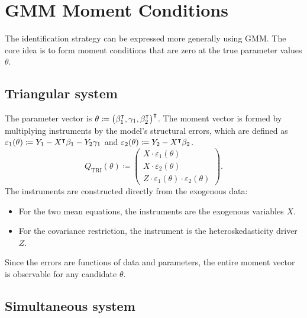 \section{GMM Moment Conditions}

The identification strategy can be expressed more generally using
GMM. The core idea is to form moment conditions that are zero at the
true parameter values $\theta$.

\subsection{Triangular system}

The parameter vector is $\theta\coloneqq\bigl(\beta_{1}^{\intercal},\gamma_{1},\beta_{2}^{\intercal}\bigr)^{\intercal}$.
The moment vector is formed by multiplying instruments by the model's
structural errors, which are defined as $\varepsilon_{1}(\theta)\coloneqq Y_{1}-X^{\intercal}\beta_{1}-Y_{2}\gamma_{1}$
and $\varepsilon_{2}(\theta)\coloneqq Y_{2}-X^{\intercal}\beta_{2}$.
\begin{equation}
Q_{\text{TRI}}(\theta)\coloneqq\begin{pmatrix}X\cdot\varepsilon_{1}(\theta)\\[3pt]
X\cdot\varepsilon_{2}(\theta)\\[3pt]
Z\cdot\varepsilon_{1}(\theta)\cdot\varepsilon_{2}(\theta)
\end{pmatrix}.\label{eq:moment_tri}
\end{equation}
The instruments are constructed directly from the exogenous data:
\begin{itemize}
\itemsep0pt
\item For the two mean equations, the instruments are the exogenous variables
$X$.
\item For the covariance restriction, the instrument is the heteroskedasticity
driver $Z$.
\end{itemize}
Since the errors are functions of data and parameters, the entire
moment vector is observable for any candidate $\theta$.

\subsection{Simultaneous system}\label{subsec:sys}

